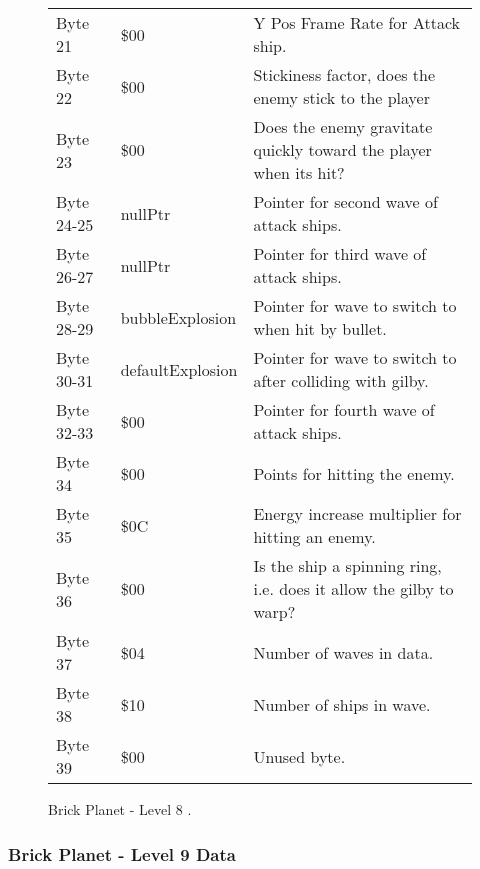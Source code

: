 \begin{figure}[H]
{\begin{adjustbox}{width=12cm}
\begin{tabular}{lll}
 Byte 21    & \$00              & Y Pos Frame Rate for Attack ship.                                   \\
 Byte 22    & \$00              & Stickiness factor, does the enemy stick to the player               \\
 Byte 23    & \$00              & Does the enemy gravitate quickly toward the player when its hit?    \\
 Byte 24-25 & nullPtr          & Pointer for second wave of attack ships.                            \\
 Byte 26-27 & nullPtr          & Pointer for third wave of attack ships.                             \\
 Byte 28-29 & bubbleExplosion  & Pointer for wave to switch to when hit by bullet.                   \\
 Byte 30-31 & defaultExplosion & Pointer for  wave to switch to after colliding with gilby.          \\
 Byte 32-33 & \$00              & Pointer for fourth wave of attack ships.                            \\
 Byte 34    & \$00              & Points for hitting the enemy.                                       \\
 Byte 35    & \$0C              & Energy increase multiplier for hitting an enemy.                    \\
 Byte 36    & \$00              & Is the ship a spinning ring, i.e. does it allow the gilby to warp?  \\
 Byte 37    & \$04              & Number of waves in data.                                            \\
 Byte 38    & \$10              & Number of ships in wave.                                            \\
 Byte 39    & \$00              & Unused byte.                                                        \\
\bottomrule
\end{tabular}

  \end{adjustbox}

  }\caption*{Brick Planet - Level 8
.}
\end{figure}

\clearpage
\subsubsection{Brick Planet - Level 9 Data}

